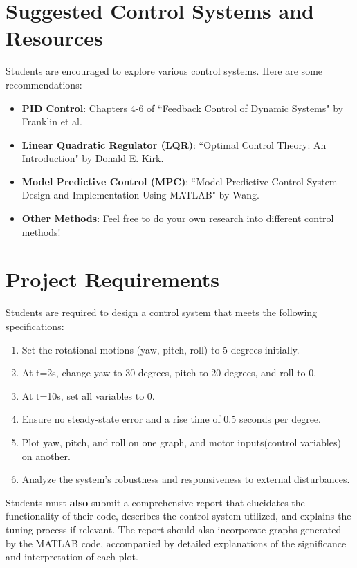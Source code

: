 \documentclass[12pt]{article}
\begin{document}
\section{Suggested Control Systems and Resources}
Students are encouraged to explore various control systems. Here are some recommendations:

\begin{itemize}
    \item \textbf{PID Control}: Chapters 4-6 of ``Feedback Control of Dynamic Systems" by Franklin et al.
    \item \textbf{Linear Quadratic Regulator (LQR)}: ``Optimal Control Theory: An Introduction" by Donald E. Kirk.
    \item \textbf{Model Predictive Control (MPC)}: ``Model Predictive Control System Design and Implementation Using MATLAB" by Wang.
    \item \textbf{Other Methods}: Feel free to do your own research into different control methods!
\end{itemize}



\section{Project Requirements}
Students are required to design a control system that meets the following specifications:

\begin{enumerate}
    \item Set the rotational motions (yaw, pitch, roll) to 5 degrees initially.
    \item At t=2s, change yaw to 30 degrees, pitch to 20 degrees, and roll to 0.
    \item At t=10s, set all variables to 0.
    \item Ensure no steady-state error and a rise time of 0.5 seconds per degree.
    \item Plot yaw, pitch, and roll on one graph, and motor inputs(control variables) on another.
    \item Analyze the system's robustness and responsiveness to external disturbances.
\end{enumerate}

Students must \textbf{also} submit a comprehensive report that elucidates the functionality of their code, describes the control system utilized, and explains the tuning process if relevant. The report should also incorporate graphs generated by the MATLAB code, accompanied by detailed explanations of the significance and interpretation of each plot.
\end{document}
